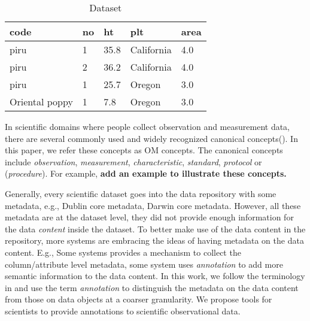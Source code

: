 \begin{table}[htb]
\begin{center}
\begin{tabular}{|l|l|l|l|l|}
\hline
code & no & ht & plt & area\\\hline
piru & 1 & 35.8 & California & 4.0\\\hline
piru & 2 & 36.2 & California & 4.0\\\hline
piru & 1 & 25.7 & Oregon & 3.0 \\\hline
Oriental poppy& 1 & 7.8 & Oregon & 3.0\\\hline 
\end{tabular}
\end{center}
\caption{Dataset}
\label{tb:dataset}
\end{table}


In scientific domains where people collect observation and measurement
data, there are several commonly used and widely recognized canonical
concepts(\cite{oboe, om}). 
In this paper, we refer these concepts as OM concepts. 
The canonical concepts include {\em observation}, {\em measurement},
{\em characteristic}, {\em standard}, {\em protocol} or ({\em procedure}). 
For example, {\bf add an example to illustrate these concepts. }


Generally, every scientific dataset goes into the data repository with
some metadata, e.g., Dublin core metadata\cite{***}, Darwin core metadata\cite{***}. 
However, all these metadata are at the dataset level, they did not
provide enough information for the data {\em content} inside the
dataset. 
To better make use of the data content in the repository, more systems
are embracing the ideas of having metadata on the data content. 
E.g., Some systems \cite{tdar} provides a mechanism to collect the
column/attribute level metadata, some system \cite{semtools} uses
{\em annotation} to add more semantic information to the data
content. In this work, we follow the terminology in \cite{semtools} and
use the term {\em annotation} to distinguish the 
metadata on the data content from those on data objects at a coarser
granularity. 
We propose tools for scientists to provide annotations to scientific
observational data. 


